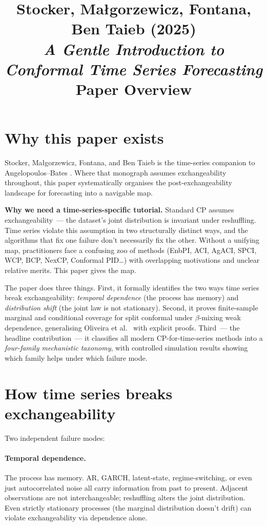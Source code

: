 \documentclass[letterpaper,11pt,leqno]{article}
\title{Stocker, Ma\l{}gorzewicz, Fontana, Ben Taieb (2025)\\\textit{A Gentle Introduction to Conformal Time Series Forecasting}\\[2pt]\large Paper Overview}
\author{}
\date{}
\begin{document}
\maketitle

\section{Why this paper exists}\label{s:intro}

Stocker, Ma\l{}gorzewicz, Fontana, and Ben Taieb \cite{stocker2025gentle} is the time-series companion to Angelopoulos--Bates \cite{angelopoulos2022gentle}. Where that monograph assumes exchangeability throughout, this paper systematically organises the post-exchangeability landscape for forecasting into a navigable map.

\begin{keyinsight}
\textbf{Why we need a time-series-specific tutorial.} Standard CP assumes exchangeability~--- the dataset's joint distribution is invariant under reshuffling. Time series violate this assumption in two structurally distinct ways, and the algorithms that fix one failure don't necessarily fix the other. Without a unifying map, practitioners face a confusing zoo of methods (EnbPI, ACI, AgACI, SPCI, WCP, BCP, NexCP, Conformal PID\ldots) with overlapping motivations and unclear relative merits. This paper gives the map.
\end{keyinsight}

The paper does three things. First, it formally identifies the two ways time series break exchangeability: \emph{temporal dependence} (the process has memory) and \emph{distribution shift} (the joint law is not stationary). Second, it proves finite-sample marginal and conditional coverage for split conformal under $\beta$-mixing weak dependence, generalising Oliveira et al.\ \cite{oliveira2024split} with explicit proofs. Third~--- the headline contribution~--- it classifies all modern CP-for-time-series methods into a \emph{four-family mechanistic taxonomy}, with controlled simulation results showing which family helps under which failure mode.

\section{How time series breaks exchangeability}\label{s:break}

Two independent failure modes:

\paragraph{Temporal dependence.} The process has memory. AR, GARCH, latent-state, regime-switching, or even just autocorrelated noise all carry information from past to present. Adjacent observations are not interchangeable; reshuffling alters the joint distribution. Even strictly stationary processes (the marginal distribution doesn't drift) can violate exchangeability via dependence alone.
\end{document}
